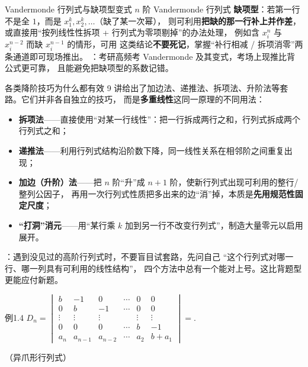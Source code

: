 \begin{fdeep}{Vandermonde 行列式与缺项型变式}
$n$ 阶 Vandermonde 行列式
\textbf{缺项型}：若第一行不是全 $1$，而是 $x_{1}^{k},x_{2}^{k},\dots$（缺了某一次幂），
则可利用\textbf{把缺的那一行补上并作差}，或直接用“按列线性性拆项 + 行列式为零项剔掉”的办法处理，
例如含 $x_{i}^{n}$ 与 $x_{i}^{n-2}$ 而缺 $x_{i}^{n-1}$ 的情形，可用
这类结论\textbf{不要死记}，掌握“补行相减 / 拆项消零”两条通道即可现场推出。
\fbref{}：考研高频考 Vandermonde 及其变式，考场上现推比背公式更可靠，
且能避免把缺项型的系数记错。
\end{fdeep}

\begin{fdeep}{各类降阶技巧为什么都有效}
9 讲给出了加边法、递推法、拆项法、升阶法等套路。它们并非各自独立的技巧，
而是\textbf{多重线性}这同一原理的不同用法：
\begin{itemize}[leftmargin=2.2em,itemsep=0.25em]
\item \textbf{拆项法}——直接使用“对某一行线性”：把一行拆成两行之和，行列式拆成两个行列式之和；
\item \textbf{递推法}——利用行列式结构沿阶数下降，同一线性关系在相邻阶之间重复出现；
\item \textbf{加边（升阶）法}——把 $n$ 阶“升”成 $n+1$ 阶，使新行列式出现可利用的整行/整列公因子，
      再用一次行列式性质把多出来的边“消”掉，本质是\textbf{先用规范性固定尺度}；
\item \textbf{“打洞”消元}——用“某行乘 $k$ 加到另一行不改变行列式”，制造大量零元以启用展开。
\end{itemize}
\fbref{}：遇到没见过的高阶行列式时，不要盲目试套路，先问自己
“这个行列式对哪一行、哪一列具有可利用的线性结构”，
四个方法中总有一个能对上号。这比背题型更能应付新题。
\end{fdeep}

\begin{fcard}{例1.4}
$D_n=\begin{vmatrix}b&-1&0&\cdots&0&0\\0&b&-1&\cdots&0&0\\\vdots&\vdots&\vdots&&\vdots&\vdots\\0&0&0&\cdots&b&-1\\a_n&a_{n-1}&a_{n-2}&\cdots&a_2&b+a_1\end{vmatrix}=$\underline{\hspace{2.6em}}.

（异爪形行列式）
\end{fcard}

